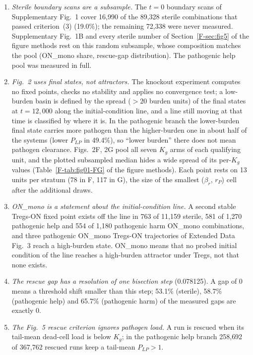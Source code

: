\documentclass[11pt]{article}
\newcommand{\bros}{\beta_r}
\begin{document}
\begin{enumerate}
\item \emph{Sterile boundary scans are a subsample.} The $t=0$ boundary scans of
  Supplementary Fig.~1 cover 16{,}990 of the 89{,}328 sterile combinations that passed criterion~(3)
  (19.0\%); the remaining 72{,}338 were never measured. Supplementary Fig.~1B and every sterile number of
  Section~\ref{F-sec:fig5} of the figure methods rest on this random subsample, whose composition matches the
  pool (ON\_mono share, rescue-gap distribution). The pathogenic help pool was measured
  in full.
\item \emph{Fig.~2 uses final states, not attractors.} The knockout experiment computes
  no fixed points, checks no stability and applies no convergence test; a low-burden
  basin is defined by the spread ($>20$ burden units) of the final states at
  $t = 12{,}000$ along the initial-condition line, and a line still moving at that time is
  classified by where it is. In the pathogenic branch the lower-burden final state
  carries more pathogen than the higher-burden one in about half of the systems
  (lower $P_{LP}$ in 49.4\%), so ``lower burden'' there does not mean pathogen
  clearance. Figs.~2F, 2G pool all seven $K_g$ arms of each qualifying unit, and the
  plotted subsampled median hides a wide spread of its per-$K_g$ values
  (Table~\ref{F-tab:fig01-FG} of the figure methods). Each point rests on 13 units per stratum (78 in F, 117
  in G), the size of the smallest ($\bros$, $r_P$) cell after the additional draws.
\item \emph{ON\_mono is a statement about the initial-condition line.} A second stable
  Tregs-ON fixed point exists off the line in 763 of 11{,}159 sterile, 581 of 1{,}270
  pathogenic help and 554 of 1{,}180 pathogenic harm ON\_mono combinations, and three
  pathogenic ON\_mono Tregs-ON trajectories of Extended Data Fig.~3 reach a
  high-burden state. ON\_mono means that no probed initial condition of the line
  reaches a high-burden attractor under Tregs, not that none exists.
\item \emph{The rescue gap has a resolution of one bisection step} (0.078125). A gap of 0
  means a threshold shift smaller than this step; 53.1\% (sterile), 58.7\% (pathogenic
  help) and 65.7\% (pathogenic harm) of the measured gaps are exactly 0.
\item \emph{The Fig.~5 rescue criterion ignores pathogen load.} A run is rescued when
  its tail-mean dead-cell load is below $K_g$; in the pathogenic help branch 258{,}692 of
  367{,}762 rescued runs keep a tail-mean $P_{LP} > 1$.

\end{enumerate}
\end{document}

